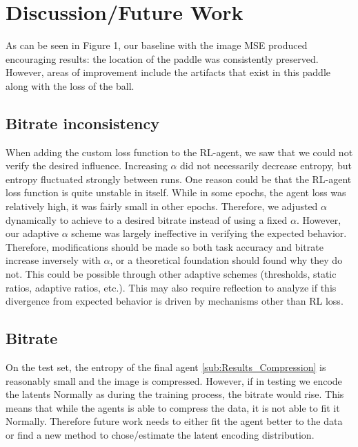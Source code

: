 \section{Discussion/Future Work}
As can be seen in Figure 1, our baseline with the image MSE produced encouraging
results: the location of the paddle was consistently preserved. However, areas
of improvement include the artifacts that exist in this paddle along with the
loss of the ball.\\
\subsection{Bitrate inconsistency}
When adding the custom loss function to the RL-agent, we saw that we could not verify the desired influence. Increasing $\alpha$ did not necessarily decrease
entropy, but entropy fluctuated strongly between runs. One
reason could be that the RL-agent loss function is quite
unstable in itself. While in some epochs, the agent loss was relatively high, it was fairly small in
other epochs. Therefore, we adjusted $\alpha$
dynamically to achieve to a desired bitrate instead of using a fixed $\alpha$.
However, our adaptive $\alpha$ scheme was largely ineffective in verifying the
expected behavior. Therefore, modifications should be made so both task
accuracy and bitrate increase inversely with $\alpha$, or a theoretical
foundation should found why they do not. This could be possible through other
adaptive schemes (thresholds, static ratios, adaptive ratios, etc.). This may
also require reflection to analyze if this divergence from expected behavior is
driven by mechanisms other than RL loss.

\subsection{Bitrate}
On the test set, the entropy of the final agent \ref{sub:Results_Compression} is
reasonably small and the image is compressed. However, if in testing we encode
the latents Normally as during the training process, the
bitrate would rise. This means that while the agents is able to
compress the data, it is not able to fit it Normally.
Therefore future work needs to either fit the agent better to the data or find
a new method to chose/estimate the latent encoding distribution.

